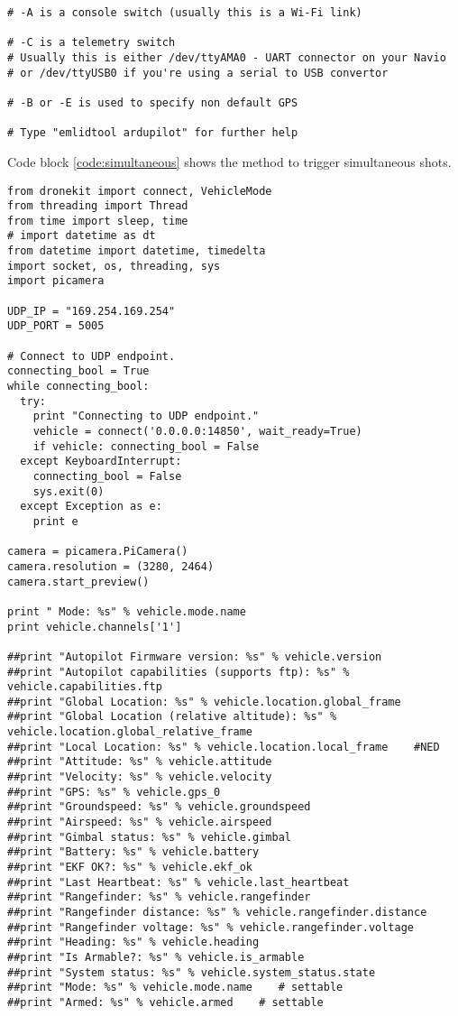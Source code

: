 \begin{appendices}
\begin{lstlisting}
# -A is a console switch (usually this is a Wi-Fi link)

# -C is a telemetry switch
# Usually this is either /dev/ttyAMA0 - UART connector on your Navio
# or /dev/ttyUSB0 if you're using a serial to USB convertor

# -B or -E is used to specify non default GPS

# Type "emlidtool ardupilot" for further help
\end{lstlisting}

Code block \ref{code:simultaneous} shows the method to trigger simultaneous shots.

\begin{lstlisting}
from dronekit import connect, VehicleMode
from threading import Thread
from time import sleep, time
# import datetime as dt
from datetime import datetime, timedelta
import socket, os, threading, sys
import picamera

UDP_IP = "169.254.169.254"
UDP_PORT = 5005

# Connect to UDP endpoint.
connecting_bool = True
while connecting_bool:
  try:
    print "Connecting to UDP endpoint."
    vehicle = connect('0.0.0.0:14850', wait_ready=True)
    if vehicle: connecting_bool = False
  except KeyboardInterrupt:
    connecting_bool = False
    sys.exit(0)
  except Exception as e:
    print e

camera = picamera.PiCamera()
camera.resolution = (3280, 2464)
camera.start_preview()

print " Mode: %s" % vehicle.mode.name
print vehicle.channels['1']

##print "Autopilot Firmware version: %s" % vehicle.version
##print "Autopilot capabilities (supports ftp): %s" % vehicle.capabilities.ftp
##print "Global Location: %s" % vehicle.location.global_frame
##print "Global Location (relative altitude): %s" % vehicle.location.global_relative_frame
##print "Local Location: %s" % vehicle.location.local_frame    #NED
##print "Attitude: %s" % vehicle.attitude
##print "Velocity: %s" % vehicle.velocity
##print "GPS: %s" % vehicle.gps_0
##print "Groundspeed: %s" % vehicle.groundspeed
##print "Airspeed: %s" % vehicle.airspeed
##print "Gimbal status: %s" % vehicle.gimbal
##print "Battery: %s" % vehicle.battery
##print "EKF OK?: %s" % vehicle.ekf_ok
##print "Last Heartbeat: %s" % vehicle.last_heartbeat
##print "Rangefinder: %s" % vehicle.rangefinder
##print "Rangefinder distance: %s" % vehicle.rangefinder.distance
##print "Rangefinder voltage: %s" % vehicle.rangefinder.voltage
##print "Heading: %s" % vehicle.heading
##print "Is Armable?: %s" % vehicle.is_armable
##print "System status: %s" % vehicle.system_status.state
##print "Mode: %s" % vehicle.mode.name    # settable
##print "Armed: %s" % vehicle.armed    # settable


\end{lstlisting}
\end{appendices}
